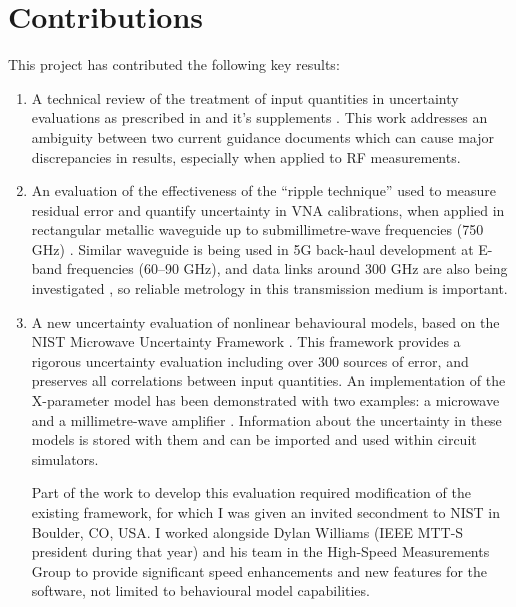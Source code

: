 \documentclass[../thesis/thesis.tex]{subfiles}
\begin{document}
\section{Contributions}
This project has contributed the following key results:
\begin{enumerate}
	\item A technical review \cite{Stant_2016} of the treatment of input quantities in uncertainty evaluations as prescribed in \cite{GUM_2008} and it's supplements \cite{GUM_S1,GUM_S2}. This work addresses an ambiguity between two current guidance documents which can cause major discrepancies in results, especially when applied to RF measurements.
	\item An evaluation of the effectiveness of the ``ripple technique'' used to measure residual error and quantify uncertainty in VNA calibrations, when applied in rectangular metallic waveguide up to submillimetre-wave frequencies (750 GHz) \cite{Stant_2017}. Similar waveguide is being used in 5G back-haul development at E-band frequencies (60--90 GHz), and data links around 300 GHz are also being investigated \cite{Song_2018}, so reliable metrology in this transmission medium is important.
	\item A new uncertainty evaluation of nonlinear behavioural models, based on the NIST Microwave Uncertainty Framework \cite{MUFWebsite}. This framework provides a rigorous uncertainty evaluation including over 300 sources of error, and preserves all correlations between input quantities. An implementation of the X-parameter model has been demonstrated with two examples: a microwave and a millimetre-wave amplifier \cite{Stant_2018_TMTT}. Information about the uncertainty in these models is stored with them and can be imported and used within circuit simulators.
	
	Part of the work to develop this evaluation required modification of the existing framework, for which I was given an invited secondment to NIST in Boulder, CO, USA. I worked alongside Dylan Williams \cite{Williams_Author} (IEEE MTT-S president during that year) and his team in the High-Speed Measurements Group to provide significant speed enhancements and new features for the software, not limited to behavioural model capabilities.
\end{enumerate}
\end{document}
